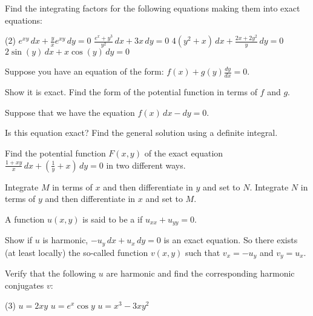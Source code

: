 \begin{exercise}
\pagebreak[2]
Find the integrating factors for the following equations making them into
exact equations:
\begin{tasks}(2)
\task
$e^{xy} \, dx + \frac{y}{x} e^{xy} \, dy = 0$
\task
$\frac{e^x+y^3}{y^2} \, dx + 3x \, dy = 0$
\task
$4(y^2+x) \, dx + \frac{2x+2y^2}{y} \, dy = 0$
\task
$2\sin(y) \, dx + x\cos(y)\, dy = 0$
\end{tasks}
\end{exercise}

\begin{exercise}
\pagebreak[2]
Suppose you have an equation of the form:
$f(x) + g(y) \frac{dy}{dx} = 0$.
\begin{tasks}
\task
Show it is exact.
\task
Find the form of the potential function in terms of $f$ and $g$.
\end{tasks}
\end{exercise}

\begin{exercise}
Suppose that we have the equation $f(x) \, dx - dy = 0$.
\begin{tasks}
\task
Is this equation exact?
\task
Find the general solution using a definite integral.
\end{tasks}
\end{exercise}

\begin{exercise}
Find the potential function $F(x,y)$ of the exact equation $\frac{1+xy}{x}\, dx +
\left(\frac{1}{y} + x \right) \, dy = 0$ in two different ways.
\begin{tasks}
\task
Integrate $M$ in terms of $x$ and then differentiate in $y$ and set to
$N$.
\task
Integrate $N$ in terms of $y$ and then differentiate in $x$ and set to
$M$.
\end{tasks}
\end{exercise}

\begin{samepage}
\begin{exercise}
A function $u(x,y)$ is said to be a \emph{} if
$u_{xx} + u_{yy} = 0$.
\begin{tasks}
\task
Show if $u$ is harmonic, $-u_y \, dx + u_x \, dy = 0$ is an exact
equation.  So there exists (at least locally)
the so-called \emph{} function
$v(x,y)$ such that $v_x = -u_y$ and $v_y = u_x$.
\end{tasks}
Verify that the following $u$ are harmonic and 
find the corresponding harmonic conjugates $v$:
\begin{tasks}[resume](3)
\task $u = 2xy$
\task $u = e^x \cos y$
\task $u = x^3-3xy^2$
\end{tasks}
\end{exercise}
\end{samepage}

